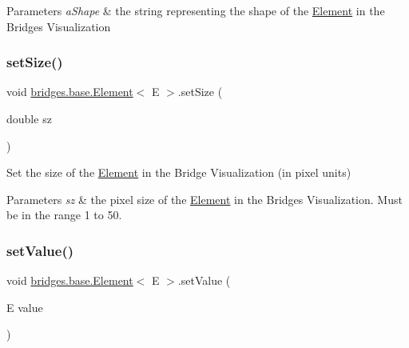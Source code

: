 \begin{DoxyParams}{Parameters}
{\em a\+Shape} & the string representing the shape of the \hyperlink{classbridges_1_1base_1_1_element}{Element} in the Bridges Visualization \\
\hline
\end{DoxyParams}
\mbox{\label{classbridges_1_1base_1_1_element_a57153c203d8d2790650edb14ad61c338}} 
\subsubsection{\texorpdfstring{set\+Size()}{setSize()}}
{\footnotesize\ttfamily void \hyperlink{classbridges_1_1base_1_1_element}{bridges.\+base.\+Element}$<$ E $>$.set\+Size (\begin{DoxyParamCaption}\item[{double}]{sz }\end{DoxyParamCaption})}

Set the size of the \hyperlink{classbridges_1_1base_1_1_element}{Element} in the Bridge Visualization (in pixel units)


\begin{DoxyParams}{Parameters}
{\em sz} & the pixel size of the \hyperlink{classbridges_1_1base_1_1_element}{Element} in the Bridges Visualization. Must be in the range 1 to 50. \\
\hline
\end{DoxyParams}
\mbox{\label{classbridges_1_1base_1_1_element_ab3cf1241da0bc4c59cea9d6f0fd7aaf4}} 
\subsubsection{\texorpdfstring{set\+Value()}{setValue()}}
{\footnotesize\ttfamily void \hyperlink{classbridges_1_1base_1_1_element}{bridges.\+base.\+Element}$<$ E $>$.set\+Value (\begin{DoxyParamCaption}\item[{E}]{value }\end{DoxyParamCaption})}

